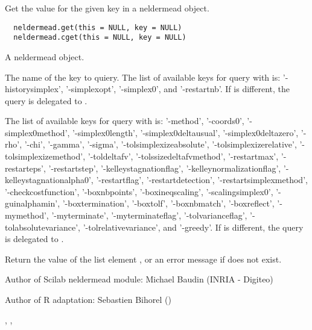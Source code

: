 %
\begin{Description}\relax
Get the value for the given key in a neldermead object.
\end{Description}
%
\begin{Usage}
\begin{verbatim}
  neldermead.get(this = NULL, key = NULL)
  neldermead.cget(this = NULL, key = NULL)
\end{verbatim}
\end{Usage}
%
\begin{Arguments}
\begin{ldescription}
\item[\code{this}] A neldermead object.
\item[\code{key}] The name of the key to quiery. The list of available keys for
query with  is: '-historysimplex',
'-simplexopt', '-simplex0', and '-restartnb'. If  is different,
the query is delegated to .

The list of available keys for query with  is:
'-method', '-coords0', '-simplex0method', '-simplex0length',
'-simplex0deltausual', '-simplex0deltazero', '-rho', '-chi', '-gamma',
'-sigma', '-tolsimplexizeabsolute', '-tolsimplexizerelative',
'-tolsimplexizemethod', '-toldeltafv', '-tolssizedeltafvmethod',
'-restartmax', '-restarteps', '-restartstep', '-kelleystagnationflag',
'-kelleynormalizationflag', '-kelleystagnationalpha0', '-restartflag',
'-restartdetection', '-restartsimplexmethod', '-checkcostfunction',
'-boxnbpoints', '-boxineqscaling', '-scalingsimplex0', '-guinalphamin',
'-boxtermination', '-boxtolf', '-boxnbmatch', '-boxreflect', '-mymethod',
'-myterminate', '-myterminateflag', '-tolvarianceflag',
'-tolabsolutevariance', '-tolrelativevariance', and '-greedy'. If 
is different, the query is delegated to .

\end{ldescription}
\end{Arguments}
%
\begin{Value}
Return the value of the list element , or an error message if
 does not exist.
\end{Value}
%
\begin{Author}\relax
Author of Scilab neldermead module: Michael Baudin (INRIA - Digiteo)

Author of R adaptation: Sebastien Bihorel ()
\end{Author}
%
\begin{SeeAlso}\relax
{},
,
\end{SeeAlso}
